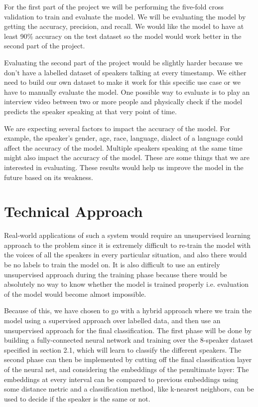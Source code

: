 \documentclass[10pt,twocolumn,letterpaper]{article}
\begin{document}
For the first part of the project we will be performing the five-fold cross validation to train and evaluate the model. We will be evaluating the model by getting the accuracy, precision, and recall. We would like the model to have at least 90\% accuracy on the test dataset so the model would work better in the second part of the project. 

Evaluating the second part of the project would be slightly harder because we don’t have a labelled dataset of speakers talking at every timestamp. We either need to build our own dataset to make it work for this specific use case or we have to manually evaluate the model. One possible way to evaluate is to play an interview video between two or more people and physically check if the model predicts the speaker speaking at that very point of time. 

We are expecting several factors to impact the accuracy of the model. For example, the speaker’s gender, age, race, language, dialect of a language could affect the accuracy of the model. Multiple speakers speaking at the same time might also impact the accuracy of the model. These are some things that we are interested in evaluating. These results would help us improve the model in the future based on its weakness. 


\section{Technical Approach}

Real-world applications of such a system would require an unsupervised learning approach to the problem since it is extremely difficult to re-train the model with the voices of all the speakers in every particular situation, and also there would be no labels to train the model on. It is also difficult to use an entirely unsupervised approach during the training phase because there would be absolutely no way to know whether the model is trained properly i.e. evaluation of the model would become almost impossible.

Because of this, we have chosen to go with a hybrid approach where we train the model using a supervised approach over labelled data, and then use an unsupervised approach for the final classification. The first phase will be done by building a fully-connected neural network and training over the 8-speaker dataset specified in section 2.1, which will learn to classify the different speakers. The second phase can then be implemented by cutting off the final classification layer of the neural net, and considering the embeddings of the penultimate layer: The embeddings at every interval can be compared to previous embeddings using some distance metric and a classification method, like k-nearest neighbors, can be used to decide if the speaker is the same or not.
\end{document}
